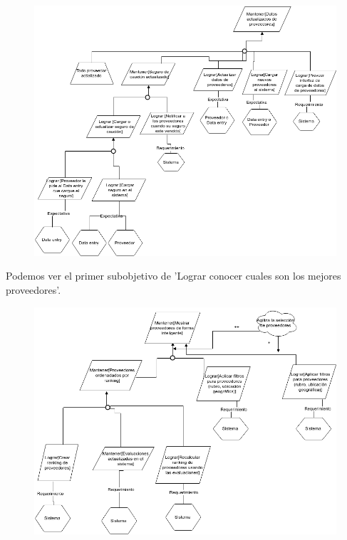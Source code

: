 \begin{figure}[H]
    \centering
    \includegraphics[width=\textwidth]{imagenes/objetivos-seleccion-mejor-proveedor-1.png}
\end{figure}

Podemos ver el primer subobjetivo de 'Lograr conocer cuales son los mejores proveedores'.

\begin{figure}[H]
    \centering
    \includegraphics[width=\textwidth]{imagenes/objetivos-seleccion-mejor-proveedor-2.png}
\end{figure}

